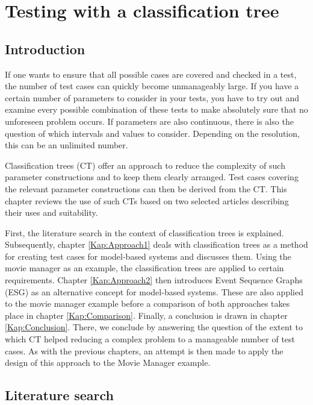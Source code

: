 \chapter{Testing with a classification tree}\label{sec:topic_5}

\section{Introduction}

If one wants to ensure that all possible cases are covered and checked in a test, the number of test cases can quickly become unmanageably large. If you have a certain number of parameters to consider in your tests, you have to try out and examine every possible combination of these tests to make absolutely sure that no unforeseen problem occurs. If parameters are also continuous, there is also the question of which intervals and values to consider. Depending on the resolution, this can be an unlimited number.

Classification trees (CT) offer an approach to reduce the complexity of such parameter constructions and to keep them clearly arranged. Test cases covering the relevant parameter constructions can then be derived from the CT. This chapter reviews the use of such CTs based on two selected articles describing their uses and suitability.

First, the literature search in the context of classification trees is explained. Subsequently, chapter \ref{Kap:Approach1} deals with classification trees as a method for creating test cases for model-based systems and discusses them. Using the movie manager as an example, the classification trees are applied to certain requirements. Chapter \ref{Kap:Approach2} then introduces Event Sequence Graphs (ESG) as an alternative concept for model-based systems. These are also applied to the movie manager example before a comparison of both approaches takes place in chapter \ref{Kap:Comparison}. Finally, a conclusion is drawn in chapter \ref{Kap:Conclusion}. There, we conclude by answering the question of the extent to which CT helped reducing a complex problem to a manageable number of test cases. As with the previous chapters, an attempt is then made to apply the design of this approach to the Movie Manager example.

\section{Literature search}

